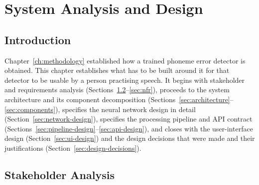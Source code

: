 \chapter{System Analysis and Design}
\label{ch:analysis-design}

\section{Introduction}

Chapter~\ref{ch:methodology} established how a trained phoneme error detector is
obtained. This chapter establishes what has to be built around it for that
detector to be usable by a person practising speech. It begins with stakeholder
and requirements analysis (Sections~\ref{sec:stakeholders}--\ref{sec:nfr}),
proceeds to the system architecture and its component decomposition
(Sections~\ref{sec:architecture}--\ref{sec:components}), specifies the neural
network design in detail (Section~\ref{sec:network-design}), specifies the
processing pipeline and API contract
(Sections~\ref{sec:pipeline-design}--\ref{sec:api-design}), and closes with the
user-interface design (Section~\ref{sec:ui-design}) and the design decisions
that were made and their justifications (Section~\ref{sec:design-decisions}).

\section{Stakeholder Analysis}
\label{sec:stakeholders}

